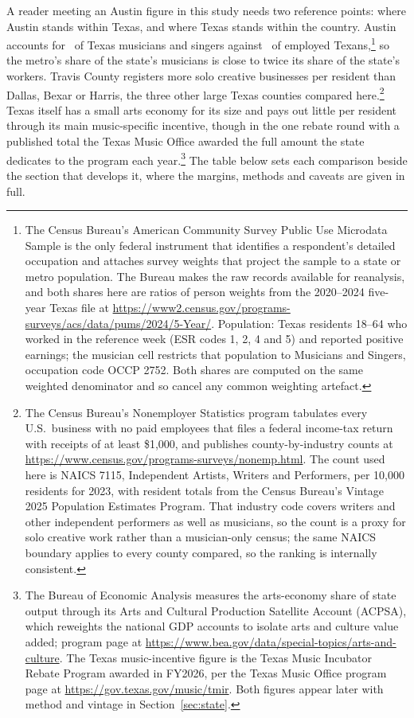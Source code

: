 A reader meeting an Austin figure in this study needs two reference points:
where Austin stands within Texas, and where Texas stands within the country.
Austin accounts for \NPumsAustinShareOfTxMusicians\ of Texas musicians and
singers against \NPumsAustinShareOfTxWorkers\ of employed Texans,\footnote{The
Census Bureau's American Community Survey Public Use Microdata Sample is the
only federal instrument that identifies a respondent's detailed occupation and
attaches survey weights that project the sample to a state or metro population.
The Bureau makes the raw records available for reanalysis, and both shares
here are ratios of person weights from the 2020--2024 five-year Texas file at
\url{https://www2.census.gov/programs-surveys/acs/data/pums/2024/5-Year/}.
Population: Texas residents 18--64 who worked in the reference week (ESR codes
1, 2, 4 and 5) and reported positive earnings; the musician cell restricts
that population to Musicians and Singers, occupation code OCCP 2752. Both
shares are computed on the same weighted denominator and so cancel any common
weighting artefact.} so the metro's share of the state's musicians is close to
twice its share of the state's workers. Travis County registers more solo
creative businesses per resident than Dallas, Bexar or Harris, the three other
large Texas counties compared here.\footnote{The Census Bureau's Nonemployer
Statistics program tabulates every U.S.\ business with no paid employees that
files a federal income-tax return with receipts of at least \$1,000, and
publishes county-by-industry counts at
\url{https://www.census.gov/programs-surveys/nonemp.html}. The count used here
is NAICS 7115, Independent Artists, Writers and Performers, per 10,000
residents for 2023, with resident totals from the Census Bureau's Vintage 2025
Population Estimates Program. That industry code covers writers and other
independent performers as well as musicians, so the count is a proxy for solo
creative work rather than a musician-only census; the same NAICS boundary
applies to every county compared, so the ranking is internally consistent.}
Texas itself has a small arts economy for its size and pays out little per
resident through its main music-specific incentive, though in the one rebate
round with a published total the Texas Music Office awarded the full amount
the state dedicates to the program each year.\footnote{The Bureau of Economic Analysis measures the arts-economy
share of state output through its Arts and Cultural Production Satellite
Account (ACPSA), which reweights the national GDP accounts to isolate arts and
culture value added; program page at
\url{https://www.bea.gov/data/special-topics/arts-and-culture}. The Texas
music-incentive figure is the Texas Music Incubator Rebate Program awarded in
FY2026, per the Texas Music Office program page at
\url{https://gov.texas.gov/music/tmir}. Both figures appear later with method
and vintage in Section~\ref{sec:state}.} The table below sets each comparison
beside the section that develops it, where the margins, methods and caveats
are given in full.

